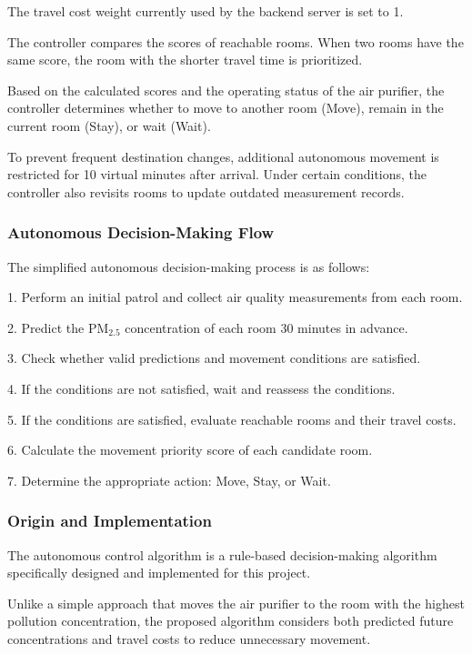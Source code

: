 \documentclass[conference]{IEEEtran}
\newcommand{\pmfine}{\ensuremath{\mathrm{PM}_{2.5}}}
\begin{document}
The travel cost weight currently used by the backend server is set to 1.

The controller compares the scores of reachable rooms. When two rooms have the same score, the room with the shorter travel time is prioritized.

Based on the calculated scores and the operating status of the air purifier, the controller determines whether to move to another room (Move), remain in the current room (Stay), or wait (Wait).

To prevent frequent destination changes, additional autonomous movement is restricted for 10 virtual minutes after arrival. Under certain conditions, the controller also revisits rooms to update outdated measurement records.

\subsubsection{Autonomous Decision-Making Flow}

The simplified autonomous decision-making process is as follows:

1. Perform an initial patrol and collect air quality measurements from each room.

2. Predict the \pmfine{} concentration of each room 30 minutes in advance.

3. Check whether valid predictions and movement conditions are satisfied.

4. If the conditions are not satisfied, wait and reassess the conditions.

5. If the conditions are satisfied, evaluate reachable rooms and their travel costs.

6. Calculate the movement priority score of each candidate room.

7. Determine the appropriate action: Move, Stay, or Wait.

\subsubsection{Origin and Implementation}

The autonomous control algorithm is a rule-based decision-making algorithm specifically designed and implemented for this project.

Unlike a simple approach that moves the air purifier to the room with the highest pollution concentration, the proposed algorithm considers both predicted future concentrations and travel costs to reduce unnecessary movement.
\end{document}
